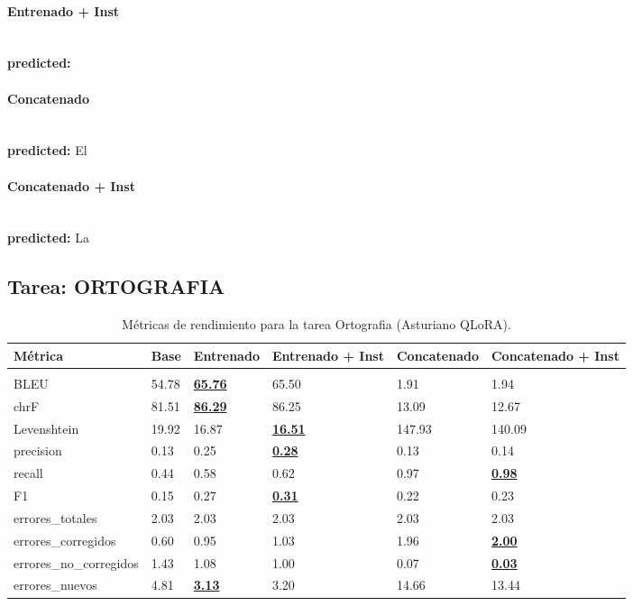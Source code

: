 \paragraph{Entrenado + Inst}~\\
\textbf{predicted:} \\

\paragraph{Concatenado}~\\
\textbf{predicted:} El\\

\paragraph{Concatenado + Inst}~\\
\textbf{predicted:} La\\

\subsection{Tarea: ORTOGRAFIA}\label{tarea-ortografia}
\begin{longtable}[]{@{}llllll@{}}
\toprule\noalign{}
Métrica & Base & Entrenado & Entrenado + Inst & Concatenado & Concatenado + Inst \\
\midrule\noalign{}
\endhead
\bottomrule\noalign{}
\caption{Métricas de rendimiento para la tarea Ortografia (Asturiano QLoRA).}
\label{tab:metricas_ortografia_Asturiano QLoRA}}\\
\endlastfoot
BLEU & 54.78 & \textbf{\underline{65.76}} & 65.50 & 1.91 & 1.94 \\
chrF & 81.51 & \textbf{\underline{86.29}} & 86.25 & 13.09 & 12.67 \\
Levenshtein & 19.92 & 16.87 & \textbf{\underline{16.51}} & 147.93 & 140.09 \\
precision & 0.13 & 0.25 & \textbf{\underline{0.28}} & 0.13 & 0.14 \\
recall & 0.44 & 0.58 & 0.62 & 0.97 & \textbf{\underline{0.98}} \\
F1 & 0.15 & 0.27 & \textbf{\underline{0.31}} & 0.22 & 0.23 \\
errores\_totales & 2.03 & 2.03 & 2.03 & 2.03 & 2.03 \\
errores\_corregidos & 0.60 & 0.95 & 1.03 & 1.96 & \textbf{\underline{2.00}} \\
errores\_no\_corregidos & 1.43 & 1.08 & 1.00 & 0.07 & \textbf{\underline{0.03}} \\
errores\_nuevos & 4.81 & \textbf{\underline{3.13}} & 3.20 & 14.66 & 13.44 \\
\end{longtable}

